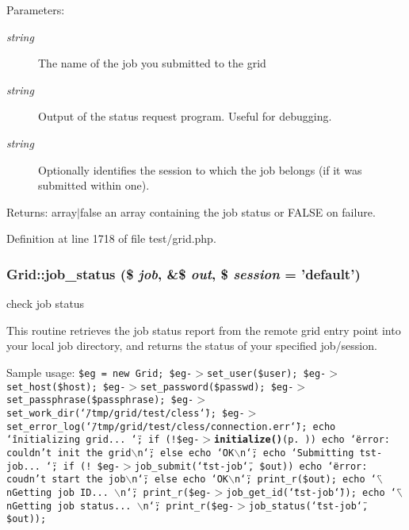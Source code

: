 \begin{Desc}
\item[Parameters:]
\begin{description}
\item[{\em string}]The name of the job you submitted to the grid \item[{\em string}]Output of the status request program. Useful for debugging. \item[{\em string}]Optionally identifies the session to which the job belongs (if it was submitted within one).\end{description}
\end{Desc}
\begin{Desc}
\item[Returns:]array$|$false an array containing the job status or FALSE on failure. \end{Desc}


Definition at line 1718 of file test/grid.php.
\subsubsection{\setlength{\rightskip}{0pt plus 5cm}Grid::job\_\-status (\$ {\em job}, \&\$ {\em out}, \$ {\em session} = 'default')}\label{classGrid_a23}


check job status 

This routine retrieves the job status report from the remote grid entry point into your local job directory, and returns the status of your specified job/session.

Sample usage: {\tt  \$eg = new Grid; \$eg-$>$set\_\-user(\$user); \$eg-$>$set\_\-host(\$host); \$eg-$>$set\_\-password(\$passwd); \$eg-$>$set\_\-passphrase(\$passphrase); \$eg-$>$set\_\-work\_\-dir(\char`\"{}/tmp/grid/test/cless\char`\"{}); \$eg-$>$set\_\-error\_\-log(\char`\"{}/tmp/grid/test/cless/connection.err\char`\"{}); echo \char`\"{}initializing grid... \char`\"{}; if (!\$eg-$>${\bf initialize()}{\rm (p.\,\pageref{classGrid_a11})}) echo \char`\"{}error: couldn't init the grid$\backslash$n\char`\"{}; else echo \char`\"{}OK$\backslash$n\char`\"{}; echo \char`\"{}Submitting tst-job... \char`\"{}; if (! \$eg-$>$job\_\-submit(\char`\"{}tst-job\char`\"{}, \$out)) echo \char`\"{}error: coudn't start the job$\backslash$n\char`\"{}; else echo \char`\"{}OK$\backslash$n\char`\"{}; print\_\-r(\$out); echo \char`\"{}$\backslash$n\-Getting job ID... $\backslash$n\char`\"{}; print\_\-r(\$eg-$>$job\_\-get\_\-id(\char`\"{}tst-job\char`\"{})); echo \char`\"{}$\backslash$n\-Getting job status... $\backslash$n\char`\"{}; print\_\-r(\$eg-$>$job\_\-status(\char`\"{}tst-job\char`\"{}, \$out)); }

